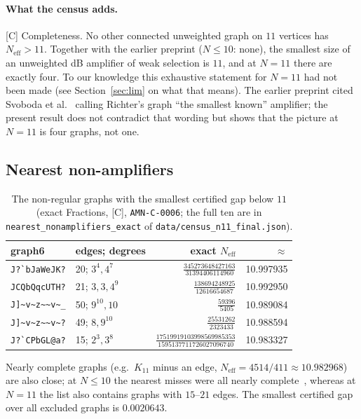 \documentclass[10pt]{article}
\newcommand{\tier}[1]{\textsf{[#1]}}
\newcommand{\tC}{\tier{C}}
\newcommand{\Neff}{N_{\mathrm{eff}}}
\begin{document}
\paragraph{What the census adds.}\tC{} Completeness. No other connected unweighted graph on $11$ vertices has $\Neff>11$. Together with the earlier preprint ($N\le10$: none), the smallest size of an unweighted dB amplifier of weak selection is $11$, and at $N=11$ there are exactly four. To our knowledge this exhaustive statement for $N=11$ had not been made (see Section~\ref{sec:lim} on what that means). The earlier preprint cited Svoboda et al.~\cite{svo} calling Richter's graph ``the smallest known'' amplifier; the present result does not contradict that wording but shows that the picture at $N=11$ is four graphs, not one.

\subsection{Nearest non-amplifiers}
\begin{table}[h]\centering\small
\caption{The non-regular graphs with the smallest certified gap below $11$ (exact Fractions, \tC, \texttt{AMN-C-0006}; the full ten are in \texttt{nearest\_nonamplifiers\_exact} of \texttt{data/census\_n11\_final.json}).}
\begin{tabular}{llrr}\toprule
graph6 & edges; degrees & exact $\Neff$ & $\approx$\\\midrule
\verb+J?`bJaWeJK?+ & 20; $3^4,4^7$ & $\tfrac{345273648427163}{31394406114960}$ & 10.997935\\
\verb+JCQbQqcUTH?+ & 21; $3,3,4^9$ & $\tfrac{138694248925}{12616654687}$ & 10.992950\\
\verb+J]~v~z~~v~_+ & 50; $9^{10},10$ & $\tfrac{59396}{5405}$ & 10.989084\\
\verb+J]~v~z~~v~?+ & 49; $8,9^{10}$ & $\tfrac{25531262}{2323433}$ & 10.988594\\
\verb+J?`CPbGL@a?+ & 15; $2^3,3^8$ & $\tfrac{17519919103998569985353}{1595137711726027096740}$ & 10.983327\\\bottomrule
\end{tabular}
\end{table}
Nearly complete graphs (e.g.\ $K_{11}$ minus an edge, $\Neff=4514/411\approx10.982968$) are also close; at $N\le10$ the nearest misses were all nearly complete~\cite{c1}, whereas at $N=11$ the list also contains graphs with $15$--$21$ edges. The smallest certified gap over all excluded graphs is $0.0020643$.
\end{document}
